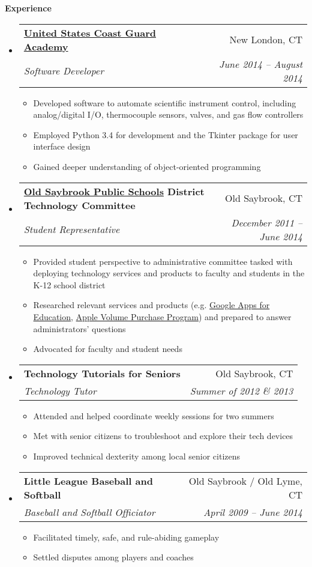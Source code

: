 \documentclass[letterpaper,10pt]{article}
\makeatletter
\newcommand{\resitem}[1]{\item #1 \vspace{-2pt}}
\newcommand{\resheading}[1]{{\large \colorbox{mygrey}{\begin{minipage}{\textwidth}{\textbf{#1 \vphantom{p\^{E}}}}\end{minipage}}}}
\newcommand{\ressubheading}[4]{
\begin{tabular*}{6.8in}{l@{\extracolsep{\fill}}r}
		\textbf{#1} & #2 \\
		\textit{#3} & \textit{#4} \\
\end{tabular*}\vspace{-6pt}}
\makeatother
\begin{document}
\resheading{Experience}
	\begin{itemize}[leftmargin=*]
		\item[] 
			\ressubheading{\href{http://www.uscga.edu}{United States Coast Guard Academy}}{New London, CT}
				{Software Developer}{June 2014 -- August 2014}
				{ \footnotesize
				\begin{itemize}
					\resitem{Developed software to automate scientific instrument control, including analog/digital I/O, thermocouple sensors, valves, and gas flow controllers}
					\resitem{Employed Python 3.4 for development and the Tkinter package for user interface design}
					\resitem{Gained deeper understanding of object-oriented programming}
				\end{itemize}
				}
		\item[]
			\ressubheading{\href{http://www.oldsaybrook.k12.ct.us}{Old Saybrook Public Schools} District Technology Committee}{Old Saybrook, CT}
				{Student Representative}{December 2011 --  June 2014}
				{\footnotesize
				\begin{itemize}
					\resitem{Provided student perspective to administrative committee tasked with deploying technology services and products to faculty and students in the K-12 school district}
					\resitem{Researched relevant services and products (e.g. \href{https://www.google.com/work/apps/education/}{Google Apps for Education}, \href{http://www.apple.com/education/it/vpp/}{Apple Volume Purchase Program}) and prepared to answer administrators' questions}
					\resitem{Advocated for faculty and student needs}
				\end{itemize}}
		\item[]
			\ressubheading{Technology Tutorials for Seniors}{Old Saybrook, CT}
				{Technology Tutor}{Summer of 2012 \& 2013}
				{\footnotesize 
				\begin{itemize}
					\resitem{Attended and helped coordinate weekly sessions for two summers}
					\resitem{Met with senior citizens to troubleshoot and explore their tech devices}
					\resitem{Improved technical dexterity among local senior citizens}
				\end{itemize}}
		\item[]
			\ressubheading{Little League Baseball and Softball}{Old Saybrook / Old Lyme, CT}
						{Baseball and Softball Officiator}{April 2009 -- June 2014}
				{\footnotesize
				\begin{itemize}
					\resitem{Facilitated timely, safe, and rule-abiding gameplay}
					\resitem{Settled disputes among players and coaches}
				\end{itemize}}
	\end{itemize}  %
	
\end{document}
